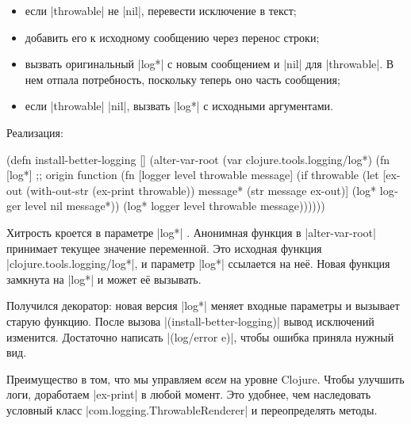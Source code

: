\begin{itemize}

\item
  если \spverb|throwable| не \spverb|nil|, перевести исключение в текст;

\item
  добавить его к исходному сообщению через перенос строки;

\item
  вызвать оригинальный \spverb|log*| с новым сообщением и \spverb|nil| для
  \spverb|throwable|. В нем отпала потребность, поскольку теперь оно часть
  сообщения;

\item
  если \spverb|throwable| \spverb|nil|, вызвать \spverb|log*| с исходными
  аргументами.

\end{itemize}

\noindent
Реализация:


\begin{english}
  \begin{clojure/lines}
(defn install-better-logging []
  (alter-var-root
   (var clojure.tools.logging/log*)
   (fn [log*] ;; origin function
     (fn [logger level throwable message]
       (if throwable
         (let [ex-out (with-out-str (ex-print throwable))
               message* (str message \newline ex-out)]
           (log* logger level nil message*))
         (log* logger level throwable message))))))
  \end{clojure/lines}
\end{english}

Хитрость кроется в параметре \spverb|log*| . Анонимная функция в
\spverb|alter-var-root| принимает текущее значение переменной. Это исходная
функция \spverb|clojure.tools.logging/log*|, и параметр \spverb|log*| ссылается
на не\"{е}. Новая функция замкнута на \spverb|log*| и может е\"{е} вызывать.

Получился декоратор: новая версия \spverb|log*| меняет входные параметры и
вызывает старую функцию. После вызова \spverb|(install-better-logging)| вывод
исключений изменится. Достаточно написать \spverb|(log/error e)|, чтобы ошибка
приняла нужный вид.

Преимущество в том, что мы управляем \emph{всем} на уровне Clojure. Чтобы
улучшить логи, доработаем \spverb|ex-print| в любой момент. Это удобнее, чем
наследовать условный класс \spverb|com.logging.ThrowableRenderer| и
переопределять методы.

